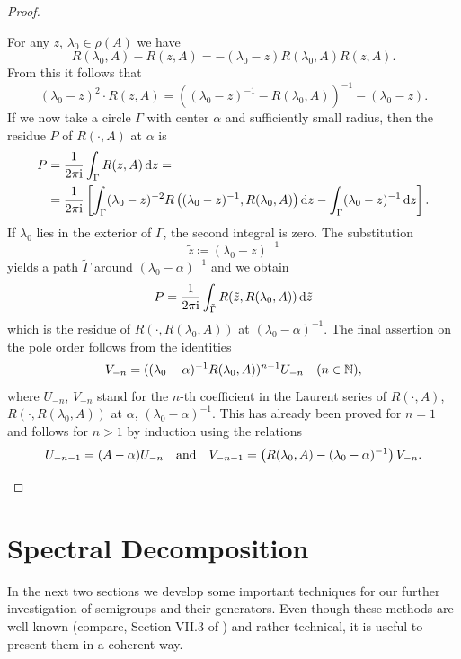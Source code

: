\begin{proof}
\begin{enumerate}[\upshape (i), wide, labelindent=.25em]
For any $z$,  $\lambda_{0} \in \rho(A)$ we have 
%
\[
R(\lambda_{0},A) - R(z,A)= -(\lambda_{0}-z)R(\lambda_{0},A)R(z,A) .
\]
%
From this it follows that 
%
\[
	(\lambda_{0}-z)^2\cdot R(z,A) = \left((\lambda_{0}-z)^{-1}-R(\lambda_{0},A)\right)^{-1} - (\lambda_{0}-z) .
\]
%
If we now take a circle $\Gamma$ with center $\alpha$ and sufficiently small radius, then the residue $P$ of\/ $R(\cdot,A)$ at $\alpha$ is
\begin{align*}
P &=  \frac{1}{2\pi\mathrm{i} } \int_{\Gamma} R(z,A)   \mathop{}\!\mathrm{d}{z} = \\
&=  \frac{1}{2\pi\mathrm{i} } \left[\int_{\Gamma} (\lambda_{0}-z)^{-2}R\left((\lambda_{0}-z)^{-1}, R(\lambda_{0},A)\right)  \mathop{}\!\mathrm{d}{z}   - 
   \int_{\Gamma}(\lambda_{0}-z)^{-1} \mathop{}\!\mathrm{d}{z} \right] . 
\end{align*}
If\/ $\lambda_{0}$ lies in the exterior of\/ $\Gamma$, the second integral is zero.
The substitution 
%
\[
	 \tilde{z} \coloneq (\lambda_{0} - z)^{-1} 
\]
%
yields a path $\tilde{\Gamma}$ around $(\lambda_{0}-\alpha)^{-1}$ and we obtain
\[
P = \frac{1}{2\pi\mathrm{i} } \int_{\tilde{\Gamma}} R(\tilde{z},R(\lambda_{0},A)) \, \mathrm{d}\tilde{z}
\]
which is the residue of\/ $R(\cdot,R(\lambda_{0},A))$ at $(\lambda_{0}-\alpha)^{-1}$.
The final assertion on the pole order follows from the identities
\[
V_{-n} = ((\lambda_{0}-\alpha)^{-1}R(\lambda_{0},A))^{n-1}U_{-n} \quad (n \in \mathbb{N}) ,
\]
where $U_{- n}$, \resp $V_{- n}$ stand for the $ n $-th coefficient in the Laurent series of\/ $R(\cdot,A)$, \resp $R(\cdot,R(\lambda_{0},A))$ at $\alpha$, \resp $(\lambda_{0}-\alpha)^{-1}$.
This has already been proved for $n = 1$ and follows for $n > 1$ by induction using the relations
\begin{equation*}
U_{-n-1} = (A - \alpha)U_{-n} 
\quad \text{and} \quad 
V_{-n-1} = \left(R(\lambda_{0},A) - (\lambda_{0}-\alpha)^{-1}\right)V_{-n} .
\qedhere
\end{equation*}
\end{enumerate}
\end{proof}
\section{Spectral Decomposition}\label{sec:a3-3}%
In the next two sections we develop some important techniques for our further investigation of semigroups and their generators.
Even though these methods are well known (compare, \eg Section VII.3 of \textcite{dunfordschwartz:1958}) and rather technical, it is useful to present them in a coherent way.

